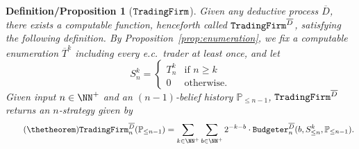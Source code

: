 \documentclass[authordate,onecolumn,noenvironments]{miri-tech-article}
\numberwithin{equation}{subsection}
\newtheorem{defprop}[theorem]{Definition/Proposition}
\newcommand{\seq}[1]{{\overline{#1}}}
\newcommand{\nn}{n}
\newcommand{\ec}[1][\ ]{e.c.#1}
\newcommand{\trade}{T}%
\newcommand{\Trader}{\seq{\trade}} %
\newcommand{\budgeter}{\text{\upshape{\texttt{Budgeter}}}\xspace}
\newcommand{\tradingfirm}{\text{\upshape{\texttt{TradingFirm}}}\xspace}
\newcommand{\BelState}{\mathbb{P}}
\newcommand{\pt}{\BelState}
\newcommand{\dt}{D}
\newcommand{\DP}{\seq{\dt}}
\begin{document}
\begin{defprop}[$\tradingfirm$]
  Given any deductive process $\DP$, there exists a computable function, henceforth called $\tradingfirm^\DP$, satisfying the following definition.  
  By Proposition~\ref{prop:enumeration}, we fix a computable enumeration $\Trader^k$ including every \ec trader at least once, and let 
  \[
    S^k_\nn=\begin{cases}T^k_\nn&\mbox{if }\nn\geq k\\0&\mbox{otherwise}.\end{cases}
  \]
  Given input $n\in\NN^+$ and an $(\nn-1)$-belief history $\pt_{\leq{n-1}}$, $\tradingfirm^\DP$ returns an $\nn$-strategy given by
  \begin{equation}\tag{\thetheorem}\label{eq:tradingfirm}
    \tradingfirm^\DP_\nn(\pt_{\leq \nn-1}) = \sum_{k\in  \NN^+}\sum_{b\in\NN^+}2^{-k-b}\cdot \budgeter^\DP_\nn(b,S^k_{\leq n} ,\pt_{\le \nn-1}).
  \end{equation}
\end{defprop}
\end{document}
